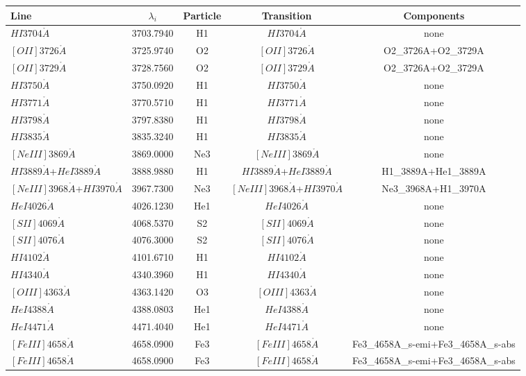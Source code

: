 \documentclass{article}%
\begin{document}
%
\normalsize%
%
\begin{preview}%
\begin{tabular}{lcccc}%
\hline%
Line&$\lambda_{i}$&Particle&Transition&Components\\%
\hline%
$HI3704\mathring{A}$&3703.7940&H1&$HI3704\mathring{A}$&none\\%
$[OII]3726\mathring{A}$&3725.9740&O2&$[OII]3726\mathring{A}$&O2\_3726A+O2\_3729A\\%
$[OII]3729\mathring{A}$&3728.7560&O2&$[OII]3729\mathring{A}$&O2\_3726A+O2\_3729A\\%
$HI3750\mathring{A}$&3750.0920&H1&$HI3750\mathring{A}$&none\\%
$HI3771\mathring{A}$&3770.5710&H1&$HI3771\mathring{A}$&none\\%
$HI3798\mathring{A}$&3797.8380&H1&$HI3798\mathring{A}$&none\\%
$HI3835\mathring{A}$&3835.3240&H1&$HI3835\mathring{A}$&none\\%
$[NeIII]3869\mathring{A}$&3869.0000&Ne3&$[NeIII]3869\mathring{A}$&none\\%
$HI3889\mathring{A}$+$HeI3889\mathring{A}$&3888.9880&H1&$HI3889\mathring{A}$+$HeI3889\mathring{A}$&H1\_3889A+He1\_3889A\\%
$[NeIII]3968\mathring{A}$+$HI3970\mathring{A}$&3967.7300&Ne3&$[NeIII]3968\mathring{A}$+$HI3970\mathring{A}$&Ne3\_3968A+H1\_3970A\\%
$HeI4026\mathring{A}$&4026.1230&He1&$HeI4026\mathring{A}$&none\\%
$[SII]4069\mathring{A}$&4068.5370&S2&$[SII]4069\mathring{A}$&none\\%
$[SII]4076\mathring{A}$&4076.3000&S2&$[SII]4076\mathring{A}$&none\\%
$HI4102\mathring{A}$&4101.6710&H1&$HI4102\mathring{A}$&none\\%
$HI4340\mathring{A}$&4340.3960&H1&$HI4340\mathring{A}$&none\\%
$[OIII]4363\mathring{A}$&4363.1420&O3&$[OIII]4363\mathring{A}$&none\\%
$HeI4388\mathring{A}$&4388.0803&He1&$HeI4388\mathring{A}$&none\\%
$HeI4471\mathring{A}$&4471.4040&He1&$HeI4471\mathring{A}$&none\\%
$[FeIII]4658\mathring{A}$&4658.0900&Fe3&$[FeIII]4658\mathring{A}$&Fe3\_4658A\_s{-}emi+Fe3\_4658A\_s{-}abs\\%
$[FeIII]4658\mathring{A}$&4658.0900&Fe3&$[FeIII]4658\mathring{A}$&Fe3\_4658A\_s{-}emi+Fe3\_4658A\_s{-}abs\\%

\end{tabular}
\end{preview}
\end{document}
